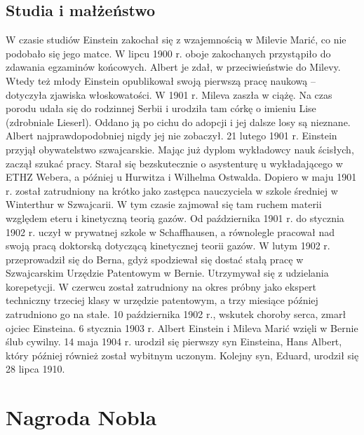 \documentclass[11pt]{article}
\begin{document}
\subsection{Studia i małżeństwo}
W czasie studiów Einstein zakochał się z wzajemnością w Milevie Marić, co nie podobało się jego matce. W lipcu 1900 r. oboje zakochanych przystąpiło do zdawania egzaminów końcowych. Albert je zdał, w przeciwieństwie do Milevy. Wtedy też młody Einstein opublikował swoją pierwszą pracę naukową – dotyczyła zjawiska włoskowatości.
W 1901 r. Mileva zaszła w ciążę. Na czas porodu udała się do rodzinnej Serbii i urodziła tam córkę o imieniu Lise (zdrobniale Lieserl). Oddano ją po cichu do adopcji i jej dalsze losy są nieznane. Albert najprawdopodobniej nigdy jej nie zobaczył.
21 lutego 1901 r. Einstein przyjął obywatelstwo szwajcarskie. Mając już dyplom wykładowcy nauk ścisłych, zaczął szukać pracy. Starał się bezskutecznie o asystenturę u wykładającego w ETHZ Webera, a później u Hurwitza i Wilhelma Ostwalda. Dopiero w maju 1901 r. został zatrudniony na krótko jako zastępca nauczyciela w szkole średniej w Winterthur w Szwajcarii. W tym czasie zajmował się tam ruchem materii względem eteru i kinetyczną teorią gazów. Od października 1901 r. do stycznia 1902 r. uczył w prywatnej szkole w Schaffhausen, a równolegle pracował nad swoją pracą doktorską dotyczącą kinetycznej teorii gazów. W lutym 1902 r. przeprowadził się do Berna, gdyż spodziewał się dostać stałą pracę w Szwajcarskim Urzędzie Patentowym w Bernie. Utrzymywał się z udzielania korepetycji. W czerwcu został zatrudniony na okres próbny jako ekspert techniczny trzeciej klasy w urzędzie patentowym, a trzy miesiące później zatrudniono go na stałe.
10 października 1902 r., wskutek choroby serca, zmarł ojciec Einsteina. 6 stycznia 1903 r. Albert Einstein i Mileva Marić wzięli w Bernie ślub cywilny. 14 maja 1904 r. urodził się pierwszy syn Einsteina, Hans Albert, który później również został wybitnym uczonym. Kolejny syn, Eduard, urodził się 28 lipca 1910\cite{Denis}.
\newpage
\section{Nagroda Nobla}
\end{document}
